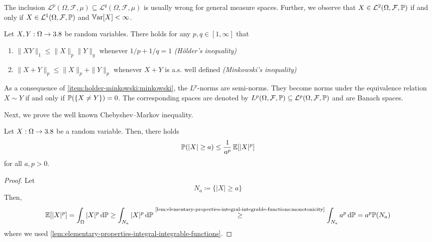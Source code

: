 \begin{remark}
The inclusion 
$
\mathcal{L}^p(\Omega,\mathcal{F},\mu)
\subseteq
\mathcal{L}^q(\Omega,\mathcal{F},\mu)
$
is usually wrong for general measure spaces.
Further, we observe that $X \in \mathcal{L}^2(\Omega,\mathcal{F},\mathbb{P})$ if and only if $X \in \mathcal{L}^1(\Omega,\mathcal{F},\mathbb{P})$ and $\operatorname{\mathbb{V}ar}[X]<\infty$.
\end{remark}

\begin{fact}\label{fact:holder-minkowski}
Let $X,Y : \Omega \to 3.8$ be random variables.
There holds for any $p,q \in [1,\infty]$ that
\begin{enumerate}[label=(\roman*)]
\item \label{item:holder-minkowski:holder}
$\|XY\|_1 \leq \|X\|_p\|Y\|_q$ whenever $1/p+1/q=1$ \emph{(Hölder's inequality)}
\item \label{item:holder-minkowski:minkowski}
$\|X+Y\|_p \leq \|X\|_p+\|Y\|_p$ whenever $X+Y$ is a.s. well defined \emph{(Minkowski's inequality)}
\qedhere
\end{enumerate}
\end{fact}

\begin{remark}
As a consequence of \ref{item:holder-minkowski:minkowski}, the $L^p$-norms are semi-norms.
They become norms under the equivalence relation $X \sim Y$ if and only if $\mathbb{P}(\{X\neq Y\})=0$.
The corresponding spaces are denoted by $L^p(\Omega,\mathcal{F},\mathbb{P}) \subseteq \mathcal{L}^p(\Omega,\mathcal{F},\mathbb{P})$ and are Banach spaces.
\end{remark}

Next, we prove the well known Chebyshev--Markov inequality.

\begin{theorem}\label{thm:chebyshev-markov}
Let $X : \Omega \to 3.8$ be a random variable.
Then, there holds
\[
\mathbb{P}(|X| \geq a)
\leq
\frac{1}{a^p}\operatorname{\mathbb{E}}[|X|^p]
\]
for all $a,p > 0$.
\end{theorem}
\begin{proof}
Let
\[
N_a \coloneq \{|X| \geq a\}
\]
Then, 
\[
\operatorname{\mathbb{E}}[|X|^p]
=
\int_{\Omega} |X|^p\,\mathrm{d}\mathbb{P}
\geq
\int_{N_a}|X|^p\,\mathrm{d}\mathbb{P}
\overset{\text{\ref{lem:elementary-properties-integral-integrable-functions:monotonicity}}}{\geq}
\int_{N_a} a^p\,\mathrm{d}\mathbb{P}
=
a^p\mathbb{P}(N_a)
\]
where we used \autoref{lem:elementary-properties-integral-integrable-functions}.
\end{proof}

